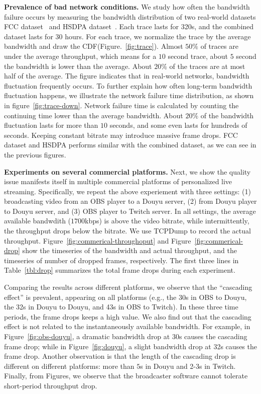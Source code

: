
\textbf{Prevalence of bad network conditions.} We study how often the bandwidth failure occurs by measuring the bandwidth distribution of two real-world datasets \textemdash\xspace FCC dataset~\cite{FCC_dataset} and HSDPA dataset~\cite{HSDPA_dataset}. Each trace lasts for 320s, and the combined dataset lasts for $30$ hours. For each trace, we normalize the trace by the average bandwidth and draw the CDF(Figure.~\ref{fig:trace}). Almost $50\%$ of traces are under the average throughput, which means for a $10$ second trace, about $5$ second the bandwidth is lower than the average. About $20\%$ of the traces are at most half of the average. The figure indicates that in real-world networks, bandwidth fluctuation frequently occurs. To further explain how often long-term bandwidth fluctuation happens, we illustrate the network failure time distribution, as shown in figure~\ref{fig:trace-down}. Network failure time is calculated by counting the continuing time lower than the average bandwidth. About $20\%$ of the bandwidth fluctuation lasts for more than $10$ seconds, and some even lasts for hundreds of seconds. Keeping constant bitrate may introduce massive frame drops. FCC dataset and HSDPA performs similar with the combined dataset, as we can see in the previous figures.


\textbf{Experiments on several commercial platforms.} 
Next, we show the quality issue manifests itself in multiple 
commercial platforms of personalized live streaming. Specifically, we
repeat the above experiement with three settings: (1) broadcasting 
video from an OBS player to a Douyu server, (2) from Douyu player to 
Douyu server, and (3) OBS player to Twitch server. In all settings, 
the average available bandwdith ($1700$kbps) is above the video 
bitrate, while intermittently, the throughput drops below the 
bitrate. We use TCPDump to record the actual throughput. 
Figure~\ref{fig:commerical-throughoput} and 
Figure~\ref{fig:commerical-drop} show the timeseries of the 
bandwidth and actual throughput, and the timeseries of number of 
dropped frames, respectively. The first three lines in 
Table~\ref{tbl:drop} summarizes the total frame drops during each 
experiment.

Comparing the results across different platforms, we observe that the ``cascading effect'' is prevalent, appearing on all platforms (e.g., the 30s in OBS to Douyu, the 32s in Douyu to Douyu, and 43s in OBS to Twitch). In these three time periods, the frame drops keeps a high value. We also find out that the cascading effect is not related to the instantaneously available bandwidth. For example, in Figure~\ref{fig:obs-douyu}, a dramatic bandwidth drop at 30s causes the cascading frame drop; while in Figure~\ref{fig:douyu}, a slight bandwidth drop at 32s causes the frame drop. Another observation is that the length of the cascading drop is different on different platforms: more than $5$s in Douyu and 2-3s in Twitch. Finally, from Figures, we observe that the broadcaster software cannot tolerate short-period throughput drop.

